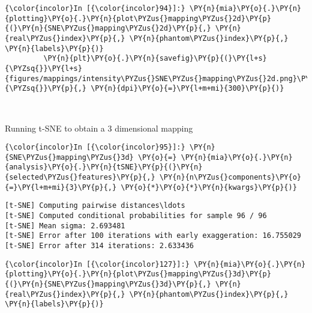     \begin{Verbatim}[commandchars=\\\{\}]
{\color{incolor}In [{\color{incolor}94}]:} \PY{n}{mia}\PY{o}{.}\PY{n}{plotting}\PY{o}{.}\PY{n}{plot\PYZus{}mapping\PYZus{}2d}\PY{p}{(}\PY{n}{SNE\PYZus{}mapping\PYZus{}2d}\PY{p}{,} \PY{n}{real\PYZus{}index}\PY{p}{,} \PY{n}{phantom\PYZus{}index}\PY{p}{,} \PY{n}{labels}\PY{p}{)}
         \PY{n}{plt}\PY{o}{.}\PY{n}{savefig}\PY{p}{(}\PY{l+s}{\PYZsq{}}\PY{l+s}{figures/mappings/intensity\PYZus{}SNE\PYZus{}mapping\PYZus{}2d.png}\PY{l+s}{\PYZsq{}}\PY{p}{,} \PY{n}{dpi}\PY{o}{=}\PY{l+m+mi}{300}\PY{p}{)}
\end{Verbatim}

    \begin{center}
    \end{center}
    { \hspace*{\fill} \\}

    Running t-SNE to obtain a 3 dimensional mapping

    \begin{Verbatim}[commandchars=\\\{\}]
{\color{incolor}In [{\color{incolor}95}]:} \PY{n}{SNE\PYZus{}mapping\PYZus{}3d} \PY{o}{=} \PY{n}{mia}\PY{o}{.}\PY{n}{analysis}\PY{o}{.}\PY{n}{tSNE}\PY{p}{(}\PY{n}{selected\PYZus{}features}\PY{p}{,} \PY{n}{n\PYZus{}components}\PY{o}{=}\PY{l+m+mi}{3}\PY{p}{,} \PY{o}{*}\PY{o}{*}\PY{n}{kwargs}\PY{p}{)}
\end{Verbatim}

    \begin{Verbatim}[commandchars=\\\{\}]
[t-SNE] Computing pairwise distances\ldots
[t-SNE] Computed conditional probabilities for sample 96 / 96
[t-SNE] Mean sigma: 2.693481
[t-SNE] Error after 100 iterations with early exaggeration: 16.755029
[t-SNE] Error after 314 iterations: 2.633436
    \end{Verbatim}

    \begin{Verbatim}[commandchars=\\\{\}]
{\color{incolor}In [{\color{incolor}127}]:} \PY{n}{mia}\PY{o}{.}\PY{n}{plotting}\PY{o}{.}\PY{n}{plot\PYZus{}mapping\PYZus{}3d}\PY{p}{(}\PY{n}{SNE\PYZus{}mapping\PYZus{}3d}\PY{p}{,} \PY{n}{real\PYZus{}index}\PY{p}{,} \PY{n}{phantom\PYZus{}index}\PY{p}{,} \PY{n}{labels}\PY{p}{)}
\end{Verbatim}

